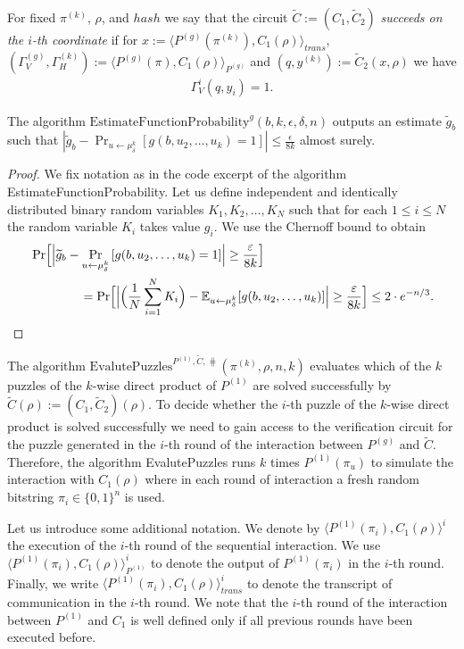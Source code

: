%
For fixed $\pi^{(k)}$, $\rho$, and $hash$ we say that the circuit $\widetilde{C} := (C_1, \widetilde{C}_2)$ \textit{succeeds on the $i$-th coordinate}
if for $x := \langle P^{(g)}(\pi^{(k)}), C_1(\rho) \rangle_{\mathit{trans}}$, $(\Gamma_V^{(g)}, \Gamma_H^{(k)}) := \langle P^{(g)}(\pi), C_1(\rho) \rangle_{P^{(g)}}$ and
$(q, y^{(k)}) := \widetilde{C}_2(x, \rho)$ we have
\begin{align*}
  \Gamma_V^i(q, y_i) = 1.
\end{align*}
%
\begin{lemma}
  \label{lemma:estimate_of_g}
  The algorithm $\text{EstimateFunctionProbability}^{g}(b, k, \epsilon, \delta, n)$ outputs an estimate $\widetilde{g}_b$
  such that $| \widetilde{g}_b - \Pr_{u \leftarrow \mu_{\delta}^{k}}\left[g(b,u_2, \dots, u_k) = 1\right] | \leq \frac{\epsilon}{8k}$ almost surely.
\end{lemma}
%
\begin{proof}
We fix notation as in the code excerpt of the algorithm EstimateFunctionProbability.
Let us define independent and identically distributed binary random variables $K_1, K_2, \dots, K_N$
such that for each $1 \leq i \leq N$ the random variable $K_i$ takes value $g_i$. We use the Chernoff bound to obtain
\begin{align*}
  &\Pr \Bigl[ \Bigl| \widetilde{g}_b - \Pr_{u \leftarrow \mu_{\delta}^{k}}\left[g(b,u_2, \dots, u_k) = 1\right] \Bigr| \geq \frac{\varepsilon}{8k} \Bigr]\\
  &\mbox\qquad\qquad = \Pr \Bigl[\Bigl|\Bigl(\frac{1}{N} \sum_{i=1}^N K_i \Bigr) - \mathbb{E}_{u \leftarrow \mu_{\delta}^k}[g(b,u_2, \dots, u_k)]\Bigr|
    \geq \frac{\varepsilon}{8k} \Bigr] \leq 2 \cdot e^{-n/3}.
\end{align*}
\end{proof}
%
The algorithm $\text{EvalutePuzzles}^{P^{(1)}, \widetilde{C}, \hash}(\pi^{(k)}, \rho, n, k)$
evaluates which of the $k$ puzzles of the $k$-wise direct product of $P^{(1)}$ are solved successfully by $\widetilde{C}(\rho) := (C_1,\widetilde{C}_2)(\rho)$.
To decide whether the $i$-th puzzle of the $k$-wise direct product is solved successfully we need to gain access to the verification circuit
for the puzzle generated in the $i$-th round of the interaction between $P^{(g)}$ and $\widetilde{C}$.
Therefore, the algorithm EvalutePuzzles runs $k$ times $P^{(1)}(\pi_u)$ to simulate the interaction with
$C_1(\rho)$ where in each round of interaction a fresh random bitstring $\pi_i \in \{0,1\}^{n}$ is used.

Let us introduce some additional notation.
We denote by $\langle P^{(1)}(\pi_i), C_1(\rho)\rangle^i$ the execution of the $i$-th round of the sequential interaction.
We use $\langle P^{(1)}(\pi_i), C_1(\rho)\rangle^i_{P^{(1)}}$ to denote the output of $P^{(1)}(\pi_i)$ in the $i$-th round.
Finally, we write $\langle P^{(1)}(\pi_i), C_1(\rho)\rangle^i_{\mathit{trans}}$ to denote the transcript of communication in the $i$-th round.
We note that the $i$-th round of the interaction between $P^{(1)}$ and $C_1$ is well defined only if all previous rounds have been executed before.

